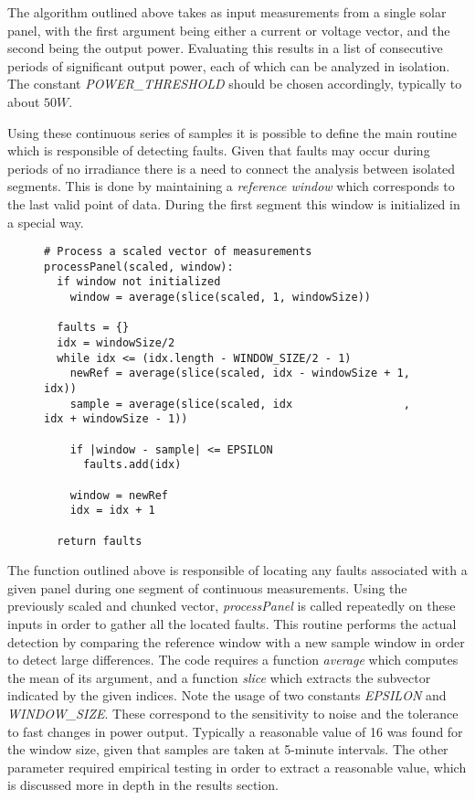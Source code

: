 The algorithm outlined above takes as input measurements from a single solar panel, with the first argument being either a current or voltage vector, and the second being the output power.
Evaluating this results in a list of consecutive periods of significant output power, each of which can be analyzed in isolation.
The constant \emph{POWER\_THRESHOLD} should be chosen accordingly, typically to about $50 W$.

Using these continuous series of samples it is possible to define the main routine which is responsible of detecting faults.
Given that faults may occur during periods of no irradiance there is a need to connect the analysis between isolated segments.
This is done by maintaining a \emph{reference window} which corresponds to the last valid point of data.
During the first segment this window is initialized in a special way.

\begin{figure}[H]
\begin{verbatim}
# Process a scaled vector of measurements
processPanel(scaled, window):
  if window not initialized
    window = average(slice(scaled, 1, windowSize))

  faults = {}
  idx = windowSize/2
  while idx <= (idx.length - WINDOW_SIZE/2 - 1)
    newRef = average(slice(scaled, idx - windowSize + 1, idx))
    sample = average(slice(scaled, idx                 , idx + windowSize - 1))

    if |window - sample| <= EPSILON
      faults.add(idx)

    window = newRef
    idx = idx + 1

  return faults
\end{verbatim}
\end{figure}

The function outlined above is responsible of locating any faults associated with a given panel during one segment of continuous measurements.
Using the previously scaled and chunked vector, \emph{processPanel} is called repeatedly on these inputs in order to gather all the located faults.
This routine performs the actual detection by comparing the reference window with a new sample window in order to detect large differences.
The code requires a function \emph{average} which computes the mean of its argument, and a function \emph{slice} which extracts the subvector indicated by the given indices.
Note the usage of two constants \emph{EPSILON} and \emph{WINDOW\_SIZE}.
These correspond to the sensitivity to noise and the tolerance to fast changes in power output.
Typically a reasonable value of 16 was found for the window size, given that samples are taken at 5-minute intervals.
The other parameter required empirical testing in order to extract a reasonable value, which is discussed more in depth in the results section.

